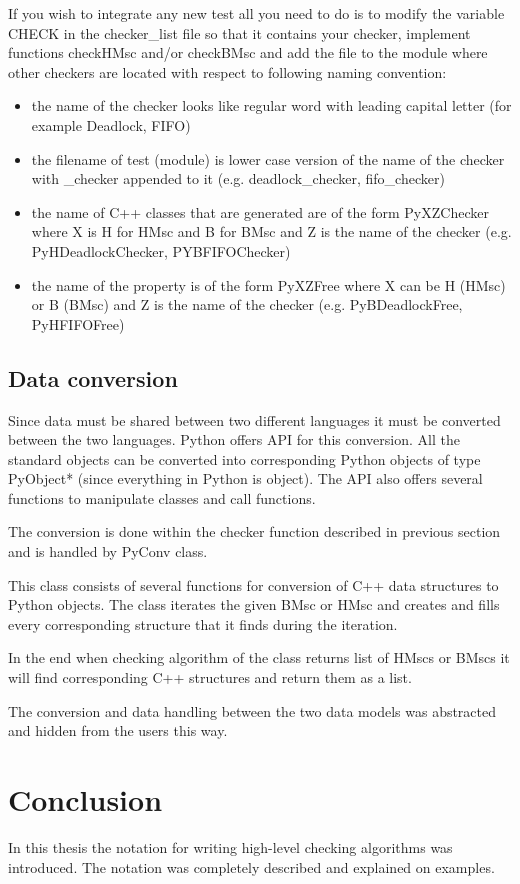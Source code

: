 \documentclass[11pt,oneside]{fithesis2}
\begin{document}
If you wish to integrate any new test all you need to do is to modify the variable CHECK in the checker\_list file so that it contains your checker, implement functions checkHMsc and/or checkBMsc and add the file to the module where other checkers are located with respect to following naming convention:
\begin{itemize}
\item{the name of the checker looks like regular word with leading capital letter (for example Deadlock, FIFO)}
\item{the filename of test (module) is lower case version of the name of the checker with \_checker appended to it (e.g. deadlock\_checker, fifo\_checker)}
\item{the name of C++ classes that are generated are of the form PyXZChecker where X is H for HMsc and B for BMsc and Z is the name of the checker (e.g. PyHDeadlockChecker, PYBFIFOChecker)}
\item{the name of the property is of the form PyXZFree where X can be H (HMsc) or B (BMsc) and Z is the name of the checker (e.g. PyBDeadlockFree, PyHFIFOFree)}
\end{itemize}

\section{Data conversion}
Since data must be shared between two different languages it must be converted between the two languages. Python offers API for this conversion. All the standard objects can be converted into corresponding Python objects of type PyObject* (since everything in Python is object). The API also offers several functions to manipulate classes and call functions.

The conversion is done within the checker function described in previous section and is handled by PyConv class.

This class consists of several functions for conversion of C++ data structures to Python objects. The class iterates the given BMsc or HMsc and creates and fills every corresponding structure that it finds during the iteration.

In the end when checking algorithm of the class returns list of HMscs or BMscs it will find corresponding C++ structures and return them as a list.

The conversion and data handling between the two data models was abstracted and hidden from the users this way.

\chapter{Conclusion}
In this thesis the notation for writing high-level checking algorithms was introduced. The notation was completely described and explained on examples.
\end{document}
